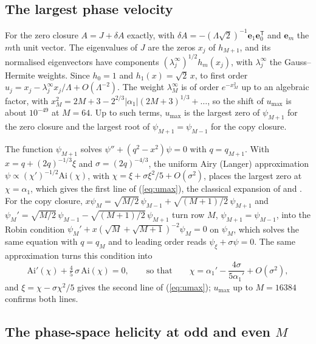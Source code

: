 \subsection{The largest phase velocity}

For the zero closure $A=J+\delta A$ exactly, with $\delta A=-(\Lambda\sqrt2)^{-1}\boldsymbol e_1\boldsymbol e_0^{\mathsf T}$ and $\boldsymbol e_m$ the $m$th unit vector. The eigenvalues of $J$ are the zeros $x_j$ of $h_{M+1}$, and its normalised eigenvectors have components $(\lambda^\infty_j)^{1/2}h_m(x_j)$, with $\lambda^\infty_j$ the Gauss--Hermite weights. Since $h_0=1$ and $h_1(x)=\sqrt2\,x$, to first order $u_j=x_j-\lambda^\infty_jx_j/\Lambda+O(\Lambda^{-2})$. The weight $\lambda^\infty_M$ is of order $e^{-x_M^2}$ up to an algebraic factor, with $x_M^2=2M+3-2^{2/3}|\alpha_1|(2M+3)^{1/3}+\dots$, so the shift of $u_{\max}$ is about $10^{-49}$ at $M=64$. Up to such terms, $u_{\max}$ is the largest zero of $\psi_{M+1}$ for the zero closure and the largest root of $\psi_{M+1}=\psi_{M-1}$ for the copy closure.

The function $\psi_{M+1}$ solves $\psi''+(q^2-x^2)\psi=0$ with $q=q_{M+1}$. With $x=q+(2q)^{-1/3}\xi$ and $\sigma=(2q)^{-4/3}$, the uniform Airy (Langer) approximation $\psi\propto(\chi')^{-1/2}\mathrm{Ai}(\chi)$, with $\chi=\xi+\sigma\xi^2/5+O(\sigma^2)$, places the largest zero at $\chi=\alpha_1$, which gives the first line of (\ref{eq:umax}), the classical expansion of \citet[theorem~6.32]{Szego1975} and \citet{Olver1959} \citep[eq.~12.11.9]{DLMF}. For the copy closure, $x\psi_M=\sqrt{M/2}\,\psi_{M-1}+\sqrt{(M+1)/2}\,\psi_{M+1}$ and $\psi_M'=\sqrt{M/2}\,\psi_{M-1}-\sqrt{(M+1)/2}\,\psi_{M+1}$ turn row $M$, $\psi_{M+1}=\psi_{M-1}$, into the Robin condition $\psi_M'+x(\sqrt M+\sqrt{M+1})^{-2}\psi_M=0$ on $\psi_M$, which solves the same equation with $q=q_M$ and to leading order reads $\psi_\xi+\sigma\psi=0$. The same approximation turns this condition into
\begin{equation*}
  \mathrm{Ai}'(\chi)+\tfrac45\,\sigma\,\mathrm{Ai}(\chi)=0,\qquad\text{so that}\qquad \chi=\alpha_1'-\frac{4\sigma}{5\alpha_1'}+O(\sigma^2),
\end{equation*}
and $\xi=\chi-\sigma\chi^2/5$ gives the second line of (\ref{eq:umax}); $u_{\max}$ up to $M=16384$ confirms both lines.

\subsection{The phase-space helicity at odd and even \texorpdfstring{$M$}{M}}

